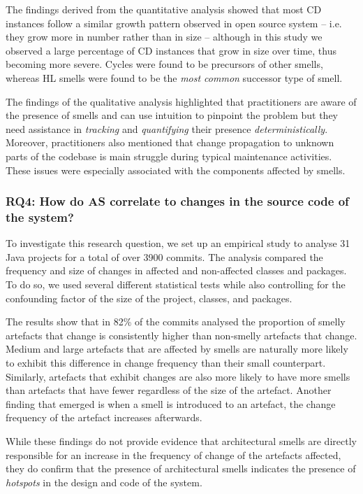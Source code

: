 The findings derived from the quantitative analysis showed that most CD instances follow a similar growth pattern observed in open source system -- i.e. they grow more in number rather than in size -- although in this study we observed a large percentage of CD instances that grow in size over time, thus becoming more severe.
Cycles were found to be precursors of other smells, whereas HL smells were found to be the \emph{most common} successor type of smell.

The findings of the qualitative analysis highlighted that practitioners are aware of the presence of smells and can use intuition to pinpoint the problem but they need assistance in \emph{tracking} and \emph{quantifying} their presence \emph{deterministically}.
Moreover, practitioners also mentioned that change propagation to unknown parts of the codebase is main struggle during typical maintenance activities.
These issues were especially associated with the components affected by smells. 

\subsubsection*{RQ4: How do AS correlate to changes in the source code of the system?}
To investigate this research question, we set up an empirical study to analyse 31 Java projects for a total of over 3900 commits.
The analysis compared the frequency and size of changes in affected and non-affected classes and packages.
To do so, we used several different statistical tests while also controlling for the confounding factor of the size of the project, classes, and packages.

The results show that in 82\% of the commits analysed the proportion of smelly artefacts that change is consistently higher than non-smelly artefacts that change.
Medium and large artefacts that are affected by smells are naturally more likely to exhibit this difference in change frequency than their small counterpart.
Similarly, artefacts that exhibit changes are also more likely to have more smells than artefacts that have fewer regardless of the size of the artefact.
Another finding that emerged is when a smell is introduced to an artefact, the change frequency of the artefact increases afterwards.

While these findings do not provide evidence that architectural smells are directly responsible for an increase in the frequency of change of the artefacts affected, they do confirm that the presence of architectural smells indicates the presence of \emph{hotspots} in the design and code of the system.


